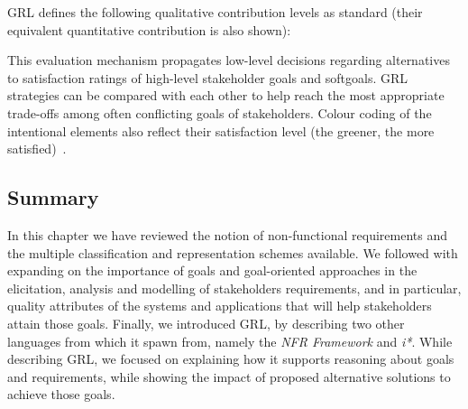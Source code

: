 \documentclass[dissertation,final]{softeng}
\begin{document}
GRL defines the following qualitative contribution levels as standard (their equivalent quantitative contribution is also shown):
\begin{table}[h!]
\caption[GRL contribution levels in jUCMNav]{GRL contribution levels in jUCMNav}
\label{tb:grl_contribution_levels}
\setlength{\extrarowheight}{1.8pt}
\centering
{}
\end{table}

This evaluation mechanism propagates low-level decisions regarding alternatives to satisfaction ratings of high-level stakeholder goals and softgoals. GRL strategies can be compared with each other to help reach the most appropriate trade-offs among often conflicting goals of stakeholders. Colour coding of the intentional elements also reflect their satisfaction level (the greener, the more satisfied)~\citep{amyot2011user}.

\subsection{Summary}

In this chapter we have reviewed the notion of non-functional requirements and the multiple classification and representation schemes available. We followed with expanding on the importance of goals and goal-oriented approaches in the elicitation, analysis and modelling of stakeholders requirements, and in particular, quality attributes of the systems and applications that will help stakeholders attain those goals. Finally, we introduced GRL, by describing two other languages from which it spawn from, namely the \emph{NFR Framework} and \emph{i*}. While describing GRL, we focused on explaining how it supports reasoning about goals and requirements, while showing the impact of proposed alternative solutions to achieve those goals.
\end{document}
